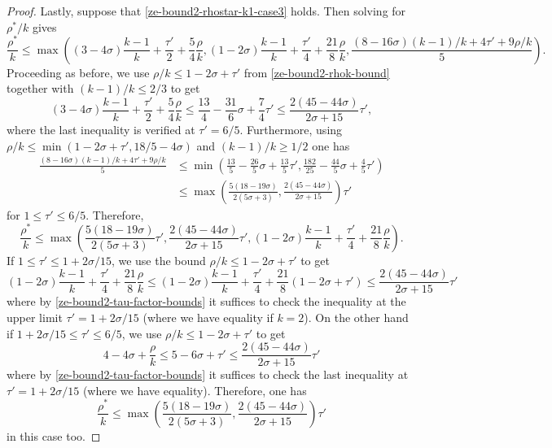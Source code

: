 \begin{proof}
Lastly, suppose that \eqref{ze-bound2-rhostar-k1-case3} holds. Then solving for $\rho^*/k$ gives 
\[
\frac{\rho^*}{k} \le \max((3 - 4\sigma)\frac{k - 1}{k} + \frac{\tau'}{2} + \frac{5}{4}\frac{\rho}{k}, (1 - 2\sigma)\frac{k - 1}{k} + \frac{\tau'}{4} + \frac{21}{8}\frac{\rho}{k}, \frac{(8 - 16\sigma)(k - 1)/k + 4\tau' + 9\rho/k}{5}).
\]
Proceeding as before, we use $\rho/k \le 1 - 2\sigma + \tau'$ from \eqref{ze-bound2-rhok-bound} together with $(k - 1)/k \le 2/3$ to get 
\[
(3 - 4\sigma)\frac{k - 1}{k} + \frac{\tau'}{2} + \frac{5}{4}\frac{\rho}{k} \le \frac{13}{4} - \frac{31}{6}\sigma + \frac{7}{4}\tau' \le \frac{2(45 - 44\sigma)}{2\sigma + 15}\tau',
\]
where the last inequality is verified at $\tau' = 6/5$. Furthermore, using $\rho/k \le \min(1 -2\sigma +\tau', 18/5-4\sigma)$ and $(k - 1)/k \ge 1/2$ one has
\begin{align*}
\frac{(8 - 16\sigma)(k - 1)/k + 4\tau' + 9\rho/k}{5} &\le \min\left(\frac{13}{5} - \frac{26}{5}\sigma + \frac{13}{5}\tau', \frac{182}{25} - \frac{44}{5}\sigma + \frac{4}{5}\tau'\right)\\
&\le \max\left(\frac{5(18-19\sigma)}{2(5\sigma+3)}, \frac{2(45 - 44\sigma)}{2\sigma + 15}\right)\tau'
\end{align*}
for $1 \le \tau' \le 6/5$. Therefore, 
\[
\frac{\rho^*}{k} \le \max\left(\frac{5(18-19\sigma)}{2(5\sigma+3)}\tau', \frac{2(45 - 44\sigma)}{2\sigma + 15}\tau', (1 - 2\sigma)\frac{k - 1}{k} + \frac{\tau'}{4} + \frac{21}{8}\frac{\rho}{k}\right).
\]
If $1 \le \tau' \le 1 + 2\sigma /15$, we use the bound $\rho/k \le 1 - 2\sigma + \tau'$ to get
\[
(1 - 2\sigma)\frac{k - 1}{k} + \frac{\tau'}{4} + \frac{21}{8}\frac{\rho}{k} \le (1 - 2\sigma)\frac{k - 1}{k} + \frac{\tau'}{4} + \frac{21}{8}(1 - 2\sigma +\tau') \le \frac{2(45 - 44\sigma)}{2\sigma + 15}\tau'
\]
where by \eqref{ze-bound2-tau-factor-bounds} it suffices to check the inequality at the upper limit $\tau' = 1 + 2\sigma/15$ (where we have equality if $k = 2$). 
On the other hand if $1 + 2\sigma/15 \le \tau' \le 6/5$, we use $\rho/k \le 1 - 2\sigma + \tau'$ to get 
\[
4 - 4\sigma + \frac{\rho}{k} \le 5 - 6\sigma + \tau'\le \frac{2(45 - 44\sigma)}{2\sigma + 15}\tau'
\]
where by \eqref{ze-bound2-tau-factor-bounds} it suffices to check the last inequality at $\tau' = 1 + 2\sigma/15$ (where we have equality). Therefore, one has 
\[
\frac{\rho^*}{k} \le \max\left(\frac{5(18 - 19\sigma)}{2(5\sigma + 3)}, \frac{2(45 - 44\sigma)}{2\sigma + 15}\right)\tau'
\]
in this case too. 

\end{proof}

